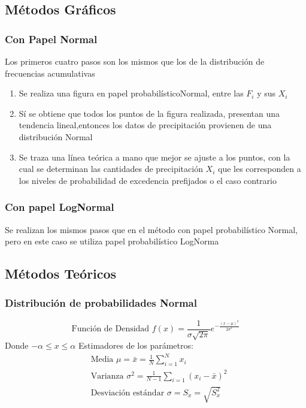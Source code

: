 \subsection{Métodos Gráficos}

\subsubsection{Con Papel Normal}
Los primeros cuatro pasos son los mismos que los de la distribución de frecuencias acumulativas
\begin{enumerate}
    \item Se realiza una figura en papel probabilísticoNormal, entre las $F_i$ y sus $X_i$
    \item Sí se obtiene que todos los puntos de la figura realizada, presentan una tendencia lineal,entonces los datos de precipitación provienen de una distribución Normal
    \item Se traza una línea teórica a mano que mejor se ajuste a los puntos, con la cual se determinan las cantidades de precipitación $X_i$ que les corresponden a los niveles de probabilidad de excedencia prefijados o el caso contrario
\end{enumerate}
\subsubsection{Con papel LogNormal}
Se realizan los mismos pasos que en el método con papel probabilístico Normal, pero en este caso se utiliza papel probabilístico LogNorma


\subsection{Métodos Teóricos}
\subsubsection{Distribución de probabilidades Normal}
\begin{equation}
    \text{Función de Densidad }f(x)= \frac{1}{\sigma\sqrt{2\pi}}e^{-\frac{(x-\mu)^2}{2\sigma^2}}
\end{equation}
Donde $-\alpha\leq x\leq \alpha$
Estimadores de los parámetros:
\begin{align}
    &\text{Media }\mu=\bar{x}=\frac{1}{N}\sum_{i=1}^{N}x_i\\
    &\text{Varianza }\sigma^2=\frac{1}{N-1}\sum_{i=1}(x_i-\bar{x})^2\\
    &\text{Desviación estándar }\sigma= S_x=\sqrt{S_x^2}
\end{align}

